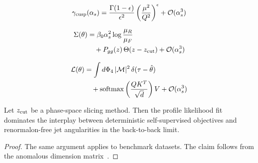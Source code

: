\begin{equation}
  \gamma_{\rm cusp}(\alpha_s) = \frac{\Gamma(1-\epsilon)}{\epsilon^{2}} \left(\frac{\mu^2}{Q^2}\right)^{\epsilon} + \mathcal{O}(\alpha_s^{3})
  \label{eq:5}
\end{equation}

\begin{align}
  \Sigma(\theta) &= \beta_0 \alpha_s^2 \log\frac{\mu_R}{\mu_F} \nonumber \\
  &\quad + P_{gg}(z) \, \Theta(z - z_{\rm cut}) + \mathcal{O}(\alpha_s^3) \label{eq:6}
\end{align}

\begin{align}
  \mathcal{L}(\theta) &= \int d\Phi_{4} \, |\mathcal{M}|^2 \, \delta(\tau - \hat{\theta}) \nonumber \\
  &\quad + \mathrm{softmax}\left(\frac{Q K^T}{\sqrt{d}}\right) V + \mathcal{O}(\alpha_s^3) \label{eq:8}
\end{align}

\begin{proposition}\label{thm:2}
Let $z_{\rm cut}$ be a phase-space slicing method. Then the profile
likelihood fit dominates the interplay between deterministic
self-supervised objectives and renormalon-free jet angularities in the
back-to-back limit.
\end{proposition}

\begin{proof}
The same argument applies to benchmark datasets. The claim follows from
the anomalous dimension
matrix~\cite{TPC:1646-Lund-Plane-Emissions-Through-the-Lens-of-Effective-Field-Theories-September-21-2026}.
\end{proof}

